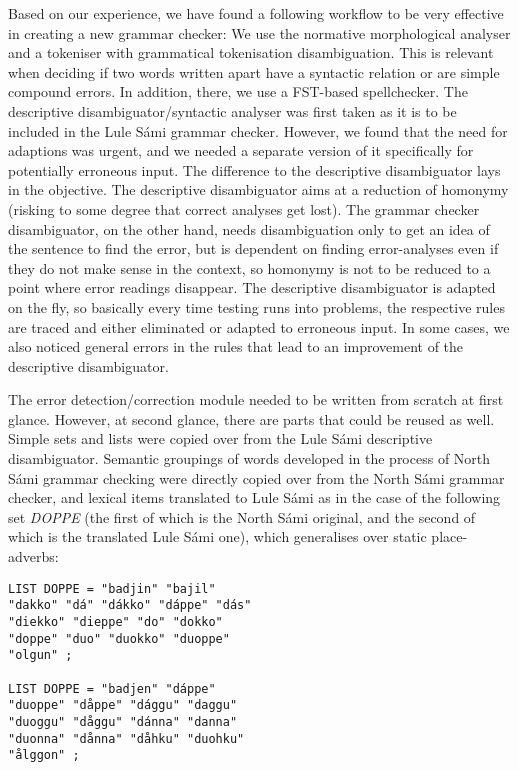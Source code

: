 \documentclass[free]{flammie}
\begin{document}
Based on our experience, we have found a following workflow to be very effective
in creating a new grammar checker: We use the normative morphological analyser
and a tokeniser with grammatical tokenisation disambiguation. This is relevant
when deciding if two words written apart have a syntactic relation or are simple
compound errors. In addition, there, we use a FST-based spellchecker.  The
descriptive disambiguator/syntactic analyser was first taken as it is to be
included in the Lule Sámi grammar checker. However, we found that the need for
adaptions was urgent, and we needed a separate version of it specifically for
potentially erroneous input. The difference to the descriptive disambiguator
lays in the objective. The descriptive disambiguator aims at a reduction of
homonymy (risking to some degree that correct analyses get lost). The grammar
checker disambiguator, on the other hand, needs disambiguation only to get an
idea of the sentence to find the error, but is dependent on finding
error-analyses even if they do not make sense in the context, so homonymy is not
to be reduced to a point where error readings disappear.  The descriptive
disambiguator is adapted on the fly, so basically every time testing runs into
problems, the respective rules are traced and either eliminated or adapted to
erroneous input.  In some cases, we also noticed general errors in the rules
that lead to an improvement of the descriptive disambiguator.






The error detection/correction module needed to be written from scratch at first
glance. However, at second glance, there are parts that could be reused as well.
Simple sets and lists were copied over from the Lule Sámi descriptive
disambiguator.  Semantic groupings of words developed in the process of North
Sámi grammar checking were directly copied over from the North Sámi grammar
checker, and lexical items translated to Lule Sámi as in the case of the
following set \textit{DOPPE} (the first of which is the North Sámi original, and
the second of which is the translated Lule Sámi one), which generalises over
static place-adverbs:

\begin{verbatim}
LIST DOPPE = "badjin" "bajil"
"dakko" "dá" "dákko" "dáppe" "dás"
"diekko" "dieppe" "do" "dokko"
"doppe" "duo" "duokko" "duoppe"
"olgun" ;

LIST DOPPE = "badjen" "dáppe"
"duoppe" "dåppe" "dággu" "daggu"
"duoggu" "dåggu" "dánna" "danna"
"duonna" "dånna" "dåhku" "duohku"
"ålggon" ;
\end{verbatim}
\end{document}
